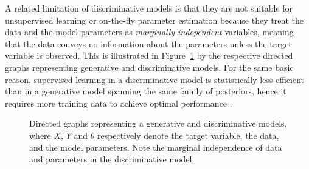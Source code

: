 \documentclass[english]{scrartcl}
\begin{document}


A related limitation of discriminative models is that they are not suitable for unsupervised learning or on-the-fly parameter estimation because they treat the data and the model parameters as {\em marginally independent} variables, meaning that the data conveys no information about the parameters unless the target variable is observed. This is illustrated in Figure~\ref{fig:graph_comparison} by the respective directed graphs representing generative and discriminative models. For the same basic reason, supervised learning in a discriminative model is statistically less efficient than in a generative model spanning the same family of posteriors, hence it requires more training data to achieve optimal performance \cite{Ng-01}. 


\begin{figure}[!ht]
\begin{center}
\hspace*{.2\textwidth}
\caption{Directed graphs representing a generative and discriminative models, where $X$, $Y$ and $\theta$ respectively denote the target variable, the data, and the model parameters. Note the marginal independence of data and parameters in the discriminative model.}
\label{fig:graph_comparison}
\end{center}
\end{figure}
\end{document}
